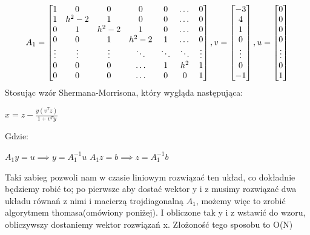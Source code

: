 \documentclass[12pt]{article}
\begin{document}
\[ A_{1}=
    \begin{bmatrix}
        1 & 0 & 0 & 0 & 0 & \dots & 0\\
        1 & h^{2}-2 & 1 & 0 & 0 & \dots & 0\\ 
        0 & 1 & h^{2}-2 & 1 & 0 & \dots & 0\\
        0 & 0 & 1 & h^{2}-2 & 1 &\dots & 0\\
        \vdots & \vdots & \vdots & \ddots & \ddots & \ddots & \vdots\\
        0 & 0 & 0 & \hdots & 1 & h^{2} & 1\\
        0 & 0 & 0 & \hdots & 0 & 0 & 1
    \end{bmatrix}
    ,v = 
    \begin{bmatrix}
        -3\\
        4\\
        1\\
        0\\
        \vdots\\
        0\\
        -1
    \end{bmatrix}
    \newline
    ,u = 
    \begin{bmatrix}
        0\\
        0\\
        0\\
        0\\
        \vdots\\
        0\\
        1
    \end{bmatrix}
\]
Stosując wzór Shermana-Morrisona, który wygląda następująca:\newline
\begin{center}
    $x = z - \frac{y(v^{T}z)}{1+v^{T}y}$ 
\end{center}
Gdzie:
\begin{center}
    $A_{1}y=u \implies y=A_{1}^{-1}u$\newline\newline
    $A_{1}z=b \implies z=A_{1}^{-1}b$ 
\end{center}
Taki zabieg pozwoli nam w czasie liniowym rozwiązać ten układ, co dokładnie będziemy robić to; po pierwsze aby dostać wektor y i z musimy rozwiązać dwa układu równań z nimi i macierzą trojdiagonalną $A_{1}$, możemy więc to zrobić algorytmem thomasa(omówiony poniżej). I obliczone tak y i z wstawić do wzoru, obliczywszy dostaniemy wektor rozwiązań x. Złożoność tego sposobu to O(N)
\end{document}
